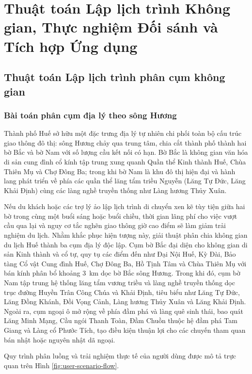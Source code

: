 \chapter{Thuật toán Lập lịch trình Không gian, Thực nghiệm Đối sánh và Tích hợp Ứng dụng}
\label{ch:thuc-nghiem}

\section{Thuật toán Lập lịch trình phân cụm không gian}
\label{sec:ch2-planner}

\subsection{Bài toán phân cụm địa lý theo sông Hương}
\label{subsec:ch2-clustering}

Thành phố Huế sở hữu một đặc trưng địa lý tự nhiên chi phối toàn bộ cấu trúc giao thông đô thị: sông Hương chảy qua trung tâm, chia cắt thành phố thành hai bờ Bắc và bờ Nam với số lượng cầu kết nối có hạn. Bờ Bắc là không gian văn hóa di sản cung đình cổ kính tập trung xung quanh Quần thể Kinh thành Huế, Chùa Thiên Mụ và Chợ Đông Ba; trong khi bờ Nam là khu đô thị hiện đại và hành lang phát triển về phía các quần thể lăng tẩm triều Nguyễn (Lăng Tự Đức, Lăng Khải Định) cùng các làng nghề truyền thống như Làng hương Thủy Xuân.

Nếu du khách hoặc các trợ lý ảo lập lịch trình di chuyển xen kẽ tùy tiện giữa hai bờ trong cùng một buổi sáng hoặc buổi chiều, thời gian lãng phí cho việc vượt cầu qua lại và nguy cơ tắc nghẽn giao thông giờ cao điểm sẽ làm giảm trải nghiệm du lịch. Nhằm khắc phục hiện tượng này, giải thuật phân chia không gian du lịch Huế thành ba cụm địa lý độc lập. Cụm bờ Bắc đại diện cho không gian di sản Kinh thành và cổ tự, quy tụ các điểm đến như Đại Nội Huế, Kỳ Đài, Bảo tàng Cổ vật Cung đình Huế, Chợ Đông Ba, Hồ Tịnh Tâm và Chùa Thiên Mụ với bán kính phân bổ khoảng 3~km dọc bờ Bắc sông Hương. Trong khi đó, cụm bờ Nam tập trung hệ thống lăng tẩm vương triều và làng nghề truyền thống dọc trục đường Huyền Trân Công Chúa và Khải Định, tiêu biểu như Lăng Tự Đức, Lăng Đồng Khánh, Đồi Vọng Cảnh, Làng hương Thủy Xuân và Lăng Khải Định. Ngoài ra, cụm ngoại ô mở rộng về phía đầm phá và làng quê sinh thái, bao quát Lăng Minh Mạng, Cầu ngói Thanh Toàn, Đầm Chuồn thuộc hệ đầm phá Tam Giang và Làng cổ Phước Tích, tạo điều kiện thuận lợi cho các chuyến tham quan bán nhật hoặc nguyên nhật dã ngoại.

Quy trình phân luồng và trải nghiệm thực tế của người dùng được mô tả trực quan trên Hình \ref{fig:user-scenario-flow}.

